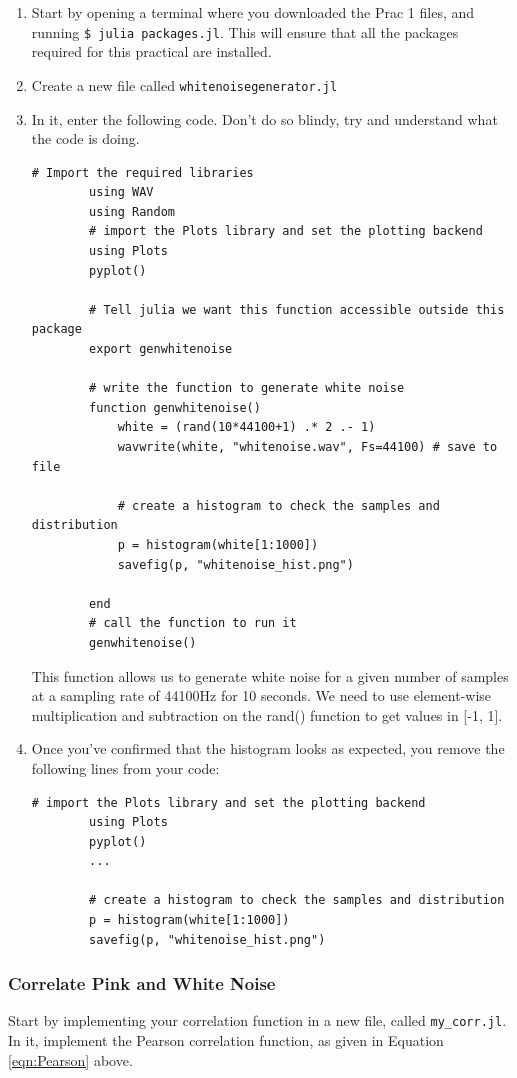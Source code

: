 \begin{enumerate}
    \item Start by opening a terminal where you downloaded the Prac 1 files, and running \verb|$ julia packages.jl|. This will ensure that all the packages required for this practical are installed.
    \item Create a new file called \verb|whitenoisegenerator.jl|
    \item In it, enter the following code. Don't do so blindy, try and understand what the code is doing.
    \begin{lstlisting}[gobble=8]
        # Import the required libraries
        using WAV
        using Random
        # import the Plots library and set the plotting backend
        using Plots
        pyplot()

        # Tell julia we want this function accessible outside this package
        export genwhitenoise 
        
        # write the function to generate white noise
        function genwhitenoise()
	        white = (rand(10*44100+1) .* 2 .- 1)
	        wavwrite(white, "whitenoise.wav", Fs=44100) # save to file
	
	        # create a histogram to check the samples and distribution
        	p = histogram(white[1:1000])
	        savefig(p, "whitenoise_hist.png")
	
        end 
        # call the function to run it
        genwhitenoise()
    \end{lstlisting}
    This function allows us to generate white noise for a given number of samples at a sampling rate of 44100Hz for 10 seconds. We need to use element-wise multiplication and subtraction on the rand() function to get values in [-1, 1].
    \item Once you've confirmed  that the histogram looks as expected, you remove the following lines from your code:
    \begin{lstlisting}[gobble=8]
        # import the Plots library and set the plotting backend
        using Plots
        pyplot()
        ...
        
        # create a histogram to check the samples and distribution
        p = histogram(white[1:1000])
        savefig(p, "whitenoise_hist.png")
	\end{lstlisting}
\end{enumerate}

\subsubsection{Correlate Pink and White Noise}
Start by implementing your correlation function in a new file, called \verb|my_corr.jl|. In it, implement the Pearson correlation function, as given in Equation \ref{eqn:Pearson} above.

